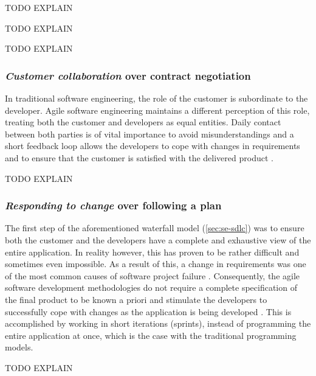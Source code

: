 TODO EXPLAIN

TODO EXPLAIN

TODO EXPLAIN

\subsubsection{\emph{Customer collaboration} over contract negotiation}
In traditional software engineering, the role of the customer is subordinate to the developer. Agile software engineering maintains a different perception of this role, treating both the customer and developers as equal entities. Daily contact between both parties is of vital importance to avoid misunderstandings and a short feedback loop allows the developers to cope with changes in requirements and to ensure that the customer is satisfied with the delivered product \cite{Hazzan2014}.

TODO EXPLAIN

\subsubsection{\emph{Responding to change} over following a plan}
The first step of the aforementioned waterfall model (\autoref{sec:se-sdlc}) was to ensure both the customer and the developers have a complete and exhaustive view of the entire application. In reality however, this has proven to be rather difficult and sometimes even impossible. As a result of this, a change in requirements was one of the most common causes of software project failure \cite{glass2001agile}. Consequently, the agile software development methodologies do not require a complete specification of the final product to be known a priori and stimulate the developers to successfully cope with changes as the application is being developed \cite{Hazzan2014}. This is accomplished by working in short iterations (sprints), instead of programming the entire application at once, which is the case with the traditional programming models.

TODO EXPLAIN

